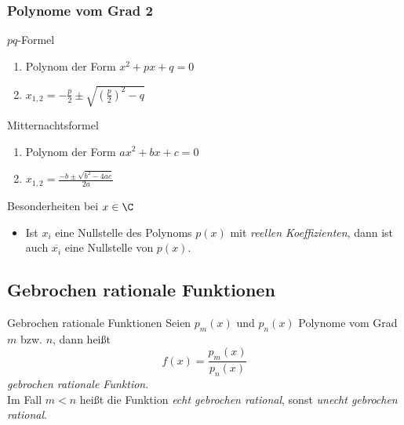 \documentclass[german]{../spicker}
\begin{document}
\subsubsection*{Polynome vom Grad 2}
\begin{halfboxl}
    \vspace{-\baselineskip}
    \begin{algo}{$pq$-Formel}
        \begin{enumerate}
            \item Polynom der Form $x^2 + px + q = 0$
            \item $x_{1,2} = -\frac{p}{2} \pm \sqrt{\left(\frac{p}{2}\right)^2 - q}$
        \end{enumerate}
    \end{algo}
\end{halfboxl}%
\begin{halfboxr}
    \vspace{-\baselineskip}
    \begin{algo}{Mitternachtsformel}
        \begin{enumerate}
            \item Polynom der Form $ax^2 + bx + c = 0$
            \item $x_{1,2} = \frac{-b \pm \sqrt{b^2 - 4ac}}{2a}$
        \end{enumerate}
    \end{algo}
\end{halfboxr}

\begin{bonus}{Besonderheiten bei $x \in \C$}
    \begin{itemize}
        \item Ist $x_i$ eine Nullstelle des Polynoms $p(x)$ mit \emph{reellen Koeffizienten}, dann ist auch $\overline{x_i}$ eine Nullstelle von $p(x)$.
    \end{itemize}
\end{bonus}

\subsection{Gebrochen rationale Funktionen}

\begin{defi}{Gebrochen rationale Funktionen}
    Seien $p_m(x)$ und $p_n(x)$ Polynome vom Grad $m$ bzw. $n$, dann heißt
    $$
        f(x) = \frac{p_m(x)}{p_n(x)}
    $$
    \emph{gebrochen rationale Funktion}.\\
    Im Fall $m<n$ heißt die Funktion \emph{echt gebrochen rational}, sonst \emph{unecht gebrochen rational}.
\end{defi}
\end{document}
